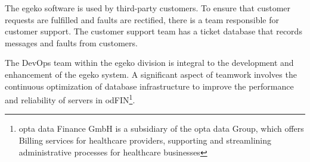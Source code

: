 The egeko software is used by third-party customers. To ensure that customer requests are fulfilled and faults are rectified, there is a team responsible for customer support. The customer support team has a ticket database that records messages and faults from customers.\vspace{.4cm}

The DevOps team within the egeko division is integral to the development and enhancement of the egeko system. A significant aspect of teamwork involves the continuous optimization of database infrastructure to improve the performance and reliability of servers in odFIN\footnote{opta data Finance GmbH is a subsidiary of the opta data Group, which offers Billing services for healthcare providers, supporting and streamlining administrative processes for healthcare businesses}.


